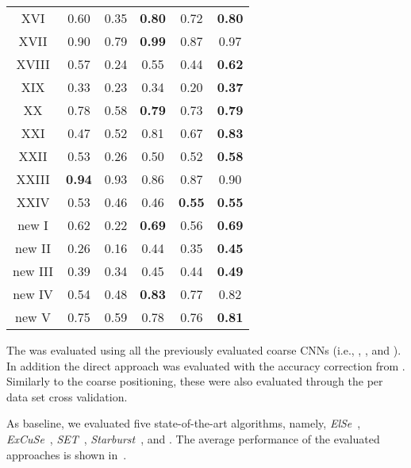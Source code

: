 \begin{table}[h!]
\begin{center}
\begin{tabular}{c|c|c|c|c|c|}
			XVI & 0.60 & 0.35 & \textbf{0.80} & 0.72 & \textbf{0.80} \\
			XVII & 0.90 & 0.79 & \textbf{0.99} & 0.87 & 0.97 \\
			XVIII & 0.57 & 0.24 & 0.55 & 0.44 & \textbf{0.62} \\
			XIX & 0.33 & 0.23 & 0.34 & 0.20 & \textbf{0.37} \\
			XX & 0.78 & 0.58 & \textbf{0.79} & 0.73 & \textbf{0.79} \\
			XXI & 0.47 & 0.52 & 0.81 & 0.67 & \textbf{0.83} \\
			XXII & 0.53 & 0.26 & 0.50 & 0.52 & \textbf{0.58} \\
			XXIII & \textbf{0.94} & 0.93 & 0.86 & 0.87 & 0.90 \\
			XXIV & 0.53 & 0.46 & 0.46 & \textbf{0.55} & \textbf{0.55} \\
			new I & 0.62 & 0.22 & \textbf{0.69} & 0.56 & \textbf{0.69} \\
			new II & 0.26 & 0.16 & 0.44 & 0.35 & \textbf{0.45} \\
			new III & 0.39 & 0.34 & 0.45 & 0.44 & \textbf{0.49} \\
			new IV & 0.54 & 0.48 & \textbf{0.83} & 0.77 & 0.82 \\
			new V & 0.75 & 0.59 & 0.78 & 0.76 & \textbf{0.81} \\
			\cline{1-6}
		\end{tabular}
	\end{center}
	\label{tbl:eye}
\end{table}

The \cfin was evaluated using all the previously evaluated coarse CNNs (i.e., , , and
). In addition the direct approach \csin{} was evaluated with the accuracy correction from . Similarly to the coarse positioning, these were also evaluated
through the per data set cross validation.

As baseline, we evaluated five state-of-the-art algorithms, namely, \emph{ElSe}~\citet{fuhl2015else},
\emph{ExCuSe}~\citet{fuhl2015excuse}, \emph{SET}~\citet{javadi2015set},
\emph{Starburst}~\citet{li2005starburst}, and \citet{swirski2012robust}. The
average performance of the evaluated approaches is shown in~.


